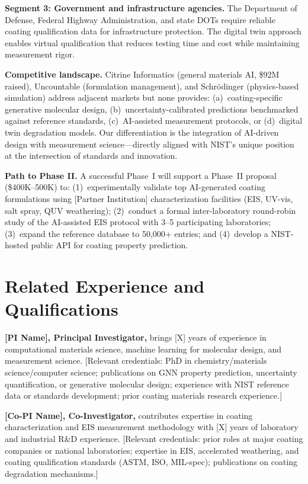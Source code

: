 \documentclass[11pt,letterpaper]{article}
\begin{document}
\textbf{Segment 3: Government and infrastructure agencies.} The Department of Defense, Federal Highway Administration, and state DOTs require reliable coating qualification data for infrastructure protection. The digital twin approach enables virtual qualification that reduces testing time and cost while maintaining measurement rigor.

\textbf{Competitive landscape.} Citrine Informatics (general materials AI, \$92M raised), Uncountable (formulation management), and Schr\"odinger (physics-based simulation) address adjacent markets but none provides: (a)~coating-specific generative molecular design, (b)~uncertainty-calibrated predictions benchmarked against reference standards, (c)~AI-assisted measurement protocols, or (d)~digital twin degradation models. Our differentiation is the integration of AI-driven design with measurement science---directly aligned with NIST's unique position at the intersection of standards and innovation.

\textbf{Path to Phase II.} A successful Phase~I will support a Phase~II proposal (\$400K--500K) to: (1)~experimentally validate top AI-generated coating formulations using [Partner Institution] characterization facilities (EIS, UV-vis, salt spray, QUV weathering); (2)~conduct a formal inter-laboratory round-robin study of the AI-assisted EIS protocol with 3--5 participating laboratories; (3)~expand the reference database to 50,000+ entries; and (4)~develop a NIST-hosted public API for coating property prediction.

\section{Related Experience and Qualifications}
\label{sec:team}

\textbf{[PI Name], Principal Investigator,} brings [X] years of experience in computational materials science, machine learning for molecular design, and measurement science. [Relevant credentials: PhD in chemistry/materials science/computer science; publications on GNN property prediction, uncertainty quantification, or generative molecular design; experience with NIST reference data or standards development; prior coating materials research experience.]

\textbf{[Co-PI Name], Co-Investigator,} contributes expertise in coating characterization and EIS measurement methodology with [X] years of laboratory and industrial R\&D experience. [Relevant credentials: prior roles at major coating companies or national laboratories; expertise in EIS, accelerated weathering, and coating qualification standards (ASTM, ISO, MIL-spec); publications on coating degradation mechanisms.]
\end{document}
